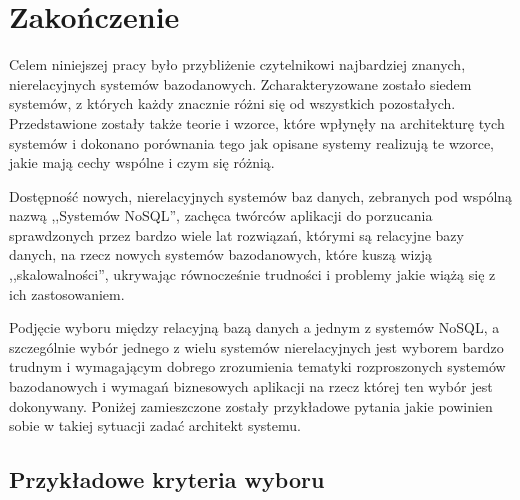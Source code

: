 \chapter{Zakończenie}

Celem niniejszej pracy było przybliżenie czytelnikowi najbardziej znanych, nierelacyjnych systemów bazodanowych.
Zcharakteryzowane zostało siedem systemów, z których każdy znacznie różni się od wszystkich pozostałych.
Przedstawione zostały także teorie i wzorce, które wpłynęły na architekturę tych systemów i dokonano porównania tego jak opisane systemy realizują te wzorce, jakie mają cechy wspólne i czym się różnią.

Dostępność nowych, nierelacyjnych systemów baz danych, zebranych pod wspólną nazwą ,,Systemów NoSQL'', zachęca twórców aplikacji do porzucania sprawdzonych przez bardzo wiele lat rozwiązań, którymi są relacyjne bazy danych, na rzecz nowych systemów bazodanowych, które kuszą wizją ,,skalowalności'', ukrywając równocześnie trudności i problemy jakie wiążą się z ich zastosowaniem.

Podjęcie wyboru między relacyjną bazą danych a jednym z systemów NoSQL, a szczególnie wybór jednego z wielu systemów nierelacyjnych jest wyborem bardzo trudnym i wymagającym dobrego zrozumienia tematyki rozproszonych systemów bazodanowych i wymagań biznesowych aplikacji na rzecz której ten wybór jest dokonywany.
Poniżej zamieszczone zostały przykładowe pytania jakie powinien sobie w takiej sytuacji zadać architekt systemu. 

\section*{Przykładowe kryteria wyboru}


